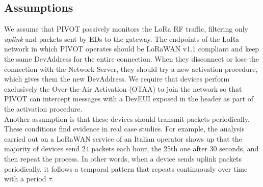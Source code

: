 \subsection{Assumptions}
We assume that PIVOT passively monitors the LoRa RF traffic, filtering only \textit{uplink} and \jr packets sent by EDs to the gateway. The endpoints of the LoRa network in which PIVOT operates should be LoRaWAN v1.1 compliant and keep the same DevAddress for the entire connection. When they disconnect or lose the connection with the Network Server, they should try a new activation procedure, which gives them the new DevAddress. We require that devices perform exclusively the Over-the-Air Activation (OTAA) to join the network so that PIVOT can intercept \jr messages with a DevEUI exposed in the header as part of the activation procedure.
\\
Another assumption is that these devices should transmit packets periodically. These conditions find evidence in real case studies. For example, the analysis carried out on a LoRaWAN service of an Italian operator \cite{devil} shows up that the majority of devices send 24 packets each hour, the 25th one after 30 seconds, and then repeat the process. In other words, when a device sends uplink packets periodically, it follows a temporal pattern that repeats continuously over time with a period \(\tau\).


